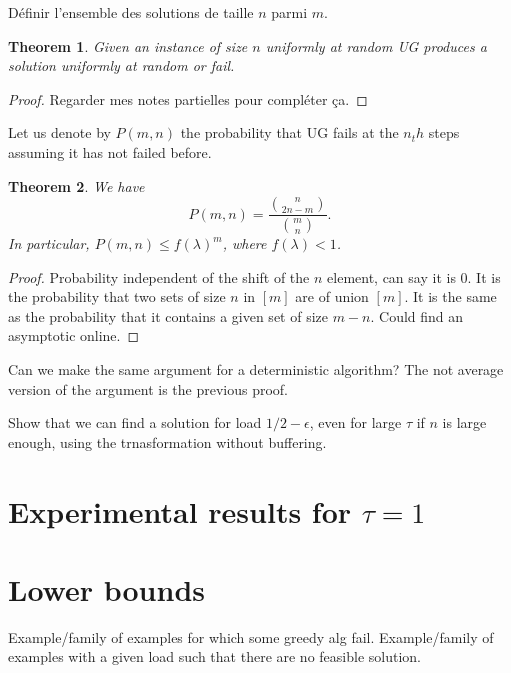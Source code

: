 \documentclass[10pt, conference, letterpaper]{IEEEtran}
\newtheorem{theorem}{Theorem}
\begin{document}
Définir l'ensemble des solutions de taille $n$ parmi $m$.
\begin{theorem}
Given an instance of size $n$ uniformly at random UG
produces a solution uniformly at random or fail.
\end{theorem}
\begin{proof}
Regarder mes notes partielles pour compléter ça.
\end{proof}

Let us denote by $P(m,n)$ the probability that UG fails at the $n_th$
steps assuming it has not failed before.

\begin{theorem}
We have $$P(m,n) = \frac{\binom{n}{2n-m}}{\binom{m}{n}}.$$
In particular, $P(m,n) \leq f(\lambda)^m$, where $f(\lambda) < 1$.
\end{theorem}
\begin{proof}
Probability independent of the shift of the $n$ element, can say it is $0$.
It is the probability that two sets of size $n$ in $[m]$ are of union $[m]$.
It is the same as the probability that it contains a given set of size $m-n$.
Could find an asymptotic online.
\end{proof}

Can we make the same argument for a deterministic algorithm?
The not average version of the argument is the previous proof.

Show that we can find a solution for load $1/2 - \epsilon$, even for large 
$\tau$ if $n$ is large enough, using the trnasformation without buffering.

\section{Experimental results for $\tau = 1$}


\section{Lower bounds}

Example/family of examples for which some greedy alg fail.
Example/family of examples with a given load such that there are no feasible solution.


 
\end{document}
